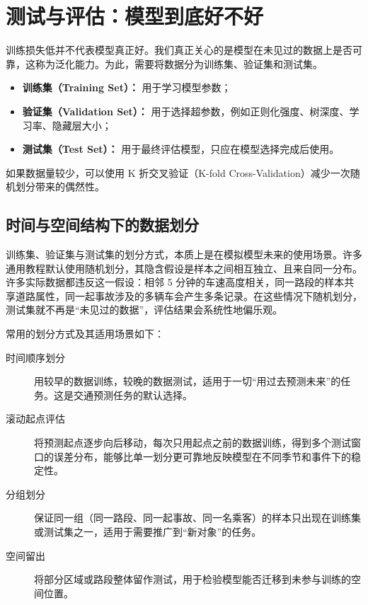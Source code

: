 \section{测试与评估：模型到底好不好}

训练损失低并不代表模型真正好。我们真正关心的是模型在未见过的数据上是否可靠，这称为泛化能力。为此，需要将数据分为训练集、验证集和测试集。

\begin{itemize}
    \item \textbf{训练集（Training Set）：} 用于学习模型参数；
    \item \textbf{验证集（Validation Set）：} 用于选择超参数，例如正则化强度、树深度、学习率、隐藏层大小；
    \item \textbf{测试集（Test Set）：} 用于最终评估模型，只应在模型选择完成后使用。
\end{itemize}
如果数据量较少，可以使用 K 折交叉验证（K-fold Cross-Validation）减少一次随机划分带来的偶然性。

\subsection{时间与空间结构下的数据划分}
\label{subsec:temporal_split}

训练集、验证集与测试集的划分方式，本质上是在模拟模型未来的使用场景。许多通用教程默认使用随机划分，其隐含假设是样本之间相互独立、且来自同一分布。许多实际数据都违反这一假设：相邻 5 分钟的车速高度相关，同一路段的样本共享道路属性，同一起事故涉及的多辆车会产生多条记录。在这些情况下随机划分，测试集就不再是“未见过的数据”，评估结果会系统性地偏乐观。

常用的划分方式及其适用场景如下：

\begin{description}
  \item[时间顺序划分] 用较早的数据训练，较晚的数据测试，适用于一切“用过去预测未来”的任务。这是交通预测任务的默认选择。
  \item[滚动起点评估] 将预测起点逐步向后移动，每次只用起点之前的数据训练，得到多个测试窗口的误差分布，能够比单一划分更可靠地反映模型在不同季节和事件下的稳定性\cite{hyndman2021forecasting}。
  \item[分组划分] 保证同一组（同一路段、同一起事故、同一名乘客）的样本只出现在训练集或测试集之一，适用于需要推广到“新对象”的任务。
  \item[空间留出] 将部分区域或路段整体留作测试，用于检验模型能否迁移到未参与训练的空间位置。
\end{description}

